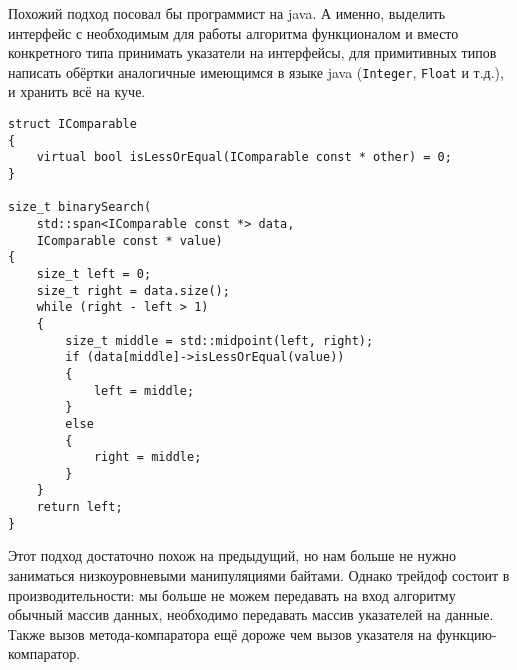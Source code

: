 Похожий подход посовал бы программист на java. А именно, выделить интерфейс с необходимым для работы алгоритма функционалом и вместо конкретного типа принимать указатели на интерфейсы, для примитивных типов написать обёртки аналогичные имеющимся в языке java (\texttt{Integer}, \texttt{Float} и т.д.), и хранить всё на куче.
\begin{verbatim}
struct IComparable
{
    virtual bool isLessOrEqual(IComparable const * other) = 0;
}

size_t binarySearch(
    std::span<IComparable const *> data,
    IComparable const * value)
{
    size_t left = 0;
    size_t right = data.size();
    while (right - left > 1)
    {
        size_t middle = std::midpoint(left, right);
        if (data[middle]->isLessOrEqual(value))
        {
            left = middle;
        }
        else
        {
            right = middle;
        }
    }
    return left;
}
\end{verbatim}
Этот подход достаточно похож на предыдущий, но нам больше не нужно заниматься низкоуровневыми манипуляциями байтами. Однако трейдоф состоит в производительности: мы больше не можем передавать на вход алгоритму обычный массив данных, необходимо передавать массив указателей на данные. Также вызов метода-компаратора ещё дороже чем вызов указателя на функцию-компаратор.

